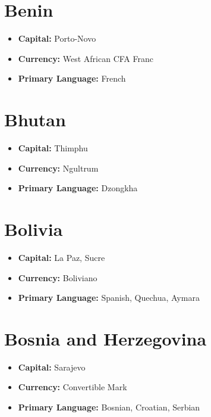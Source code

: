 \documentclass[a4paper,100pt,twoside]{book}
\begin{document}
\section*{\Huge Benin}
\vspace{5mm} %
\begin{itemize}
	\item \textbf{Capital:} Porto-Novo
	\item \textbf{Currency:} West African CFA Franc
	\item \textbf{Primary Language:} French
\end{itemize}

\section*{\Huge Bhutan}
\vspace{5mm} %
\begin{itemize}
	\item \textbf{Capital:} Thimphu
	\item \textbf{Currency:} Ngultrum
	\item \textbf{Primary Language:} Dzongkha
\end{itemize}

\section*{\Huge Bolivia}
\vspace{5mm} %
\begin{itemize}
	\item \textbf{Capital:} La Paz, Sucre
	\item \textbf{Currency:} Boliviano
	\item \textbf{Primary Language:} Spanish, Quechua, Aymara
\end{itemize}

\section*{\Huge Bosnia and Herzegovina}
\vspace{5mm} %
\begin{itemize}
	\item \textbf{Capital:} Sarajevo
	\item \textbf{Currency:} Convertible Mark
	\item \textbf{Primary Language:} Bosnian, Croatian, Serbian
\end{itemize}
\end{document}
